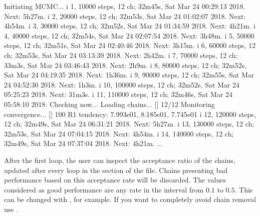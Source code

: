 \documentclass[letterpaper,12pt,english]{sphinxhowto}
\begin{document}
%
\begin{sphinxVerbatim}[commandchars=\\\{\}]
Initiating MCMC...
i 1, 10000 steps, 12 ch; 32m45s, Sat Mar 24 00:29:13 2018. Next: \PYGZti{}5h27m.
i 2, 20000 steps, 12 ch; 32m53s, Sat Mar 24 01:02:07 2018. Next: \PYGZti{}4h54m.
i 3, 30000 steps, 12 ch; 32m52s, Sat Mar 24 01:34:59 2018. Next: \PYGZti{}4h21m.
i 4, 40000 steps, 12 ch; 32m54s, Sat Mar 24 02:07:54 2018. Next: \PYGZti{}3h48m.
i 5, 50000 steps, 12 ch; 32m51s, Sat Mar 24 02:40:46 2018. Next: \PYGZti{}3h15m.
i 6, 60000 steps, 12 ch; 32m53s, Sat Mar 24 03:13:39 2018. Next: \PYGZti{}2h42m.
i 7, 70000 steps, 12 ch; 33m3s, Sat Mar 24 03:46:43 2018. Next: \PYGZti{}2h9m.
i 8, 80000 steps, 12 ch; 32m52s, Sat Mar 24 04:19:35 2018. Next: \PYGZti{}1h36m.
i 9, 90000 steps, 12 ch; 32m55s, Sat Mar 24 04:52:30 2018. Next: \PYGZti{}1h3m.
i 10, 100000 steps, 12 ch; 32m52s, Sat Mar 24 05:25:23 2018. Next: \PYGZti{}31m3s.
i 11, 110000 steps, 12 ch; 32m46s, Sat Mar 24 05:58:10 2018. Checking now...
Loading chains...                                            [\PYGZsh{}\PYGZsh{}\PYGZsh{}\PYGZsh{}\PYGZsh{}\PYGZsh{}\PYGZsh{}\PYGZsh{}\PYGZsh{}\PYGZsh{}]  12/12
Monitoring convergence...                                    [\PYGZsh{}\PYGZsh{}\PYGZsh{}\PYGZsh{}\PYGZsh{}\PYGZsh{}\PYGZsh{}\PYGZsh{}\PYGZsh{}\PYGZsh{}]  100\PYGZpc{}
R\PYGZhy{}1 tendency: 7.993e\PYGZhy{}01, 8.185e\PYGZhy{}01, 7.745e\PYGZhy{}01
i 12, 120000 steps, 12 ch; 32m49s, Sat Mar 24 06:31:21 2018. Next: \PYGZti{}5h27m.
i 13, 130000 steps, 12 ch; 32m53s, Sat Mar 24 07:04:15 2018. Next: \PYGZti{}4h54m.
i 14, 140000 steps, 12 ch; 32m49s, Sat Mar 24 07:37:04 2018. Next: \PYGZti{}4h21m.
...
\end{sphinxVerbatim}

After the first loop, the user can inspect the acceptance ratio
of the chains, updated after every loop in the section  of
the  file.
Chains presenting bad performance based on this acceptance rate will be discarded.
The values considered as good performance are any rate in the interval from
\(0.1\) to \(0.5\).
This can be changed with , for example.
If you want to completely avoid chain removal use .
\end{document}
